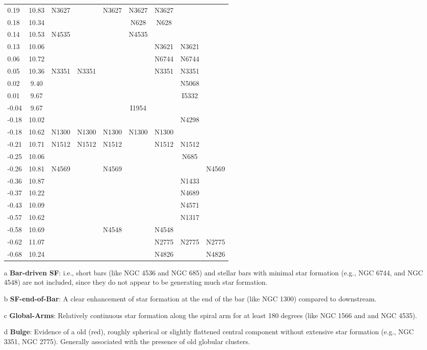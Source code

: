 \documentclass[linenumbers]{aastex63}
\begin{document}
\begin{table*}
\begin{center}
\begin{threeparttable}
\begin{tabular}{lcccccccc}
0.19 & 10.83 & N3627 &  & N3627 & N3627 & N3627 &  & \\
0.18 & 10.34 &  &  &  & N628 & N628 &  & \\
0.14 & 10.53 & N4535 &  &  & N4535 &  &  & \\
0.13 & 10.06 &  &  &  &  & N3621 & N3621 & \\
0.06 & 10.72 &  &  &  &  & N6744 & N6744 & \\
0.05 & 10.36 & N3351 & N3351 &  &  & N3351 & N3351 & \\
0.02 & 9.40 &  &  &  &  &  & N5068 & \\
0.01 & 9.67 &  &  &  &  &  & I5332 & \\
-0.04 & 9.67 &  &  &  & I1954 &  &  & \\
-0.18 & 10.02 &  &  &  &  &  & N4298 & \\
-0.18 & 10.62 & N1300 & N1300 & N1300 & N1300 & N1300 &  & \\
-0.21 & 10.71 & N1512 & N1512 & N1512 &  & N1512 & N1512 & \\
-0.25 & 10.06 &  &  &  &  &  & N685 & \\
-0.26 & 10.81 & N4569 &  & N4569 &  &  &  & N4569\\
-0.36 & 10.87 &  &  &  &  &  & N1433 & \\
-0.37 & 10.22 &  &  &  &  &  & N4689 & \\
-0.43 & 10.09 &  &  &  &  &  & N4571 & \\
-0.57 & 10.62 &  &  &  &  &  & N1317 & \\
-0.58 & 10.69 &  &  & N4548 &  & N4548 &  & \\
-0.62 & 11.07 &  &  &  &  & N2775 & N2775 & N2775\\
-0.68 & 10.24 &  &  &  &  & N4826 &  & N4826\\
\hline
\end{tabular} 
\begin{tablenotes}
\item[a] \textbf{Bar-driven SF}: i.e., short bars (like NGC 4536 and NGC 685) and stellar bars 
with minimal star formation
(e.g., NGC 6744, and NGC 4548) are not included, since they do not appear  to be generating much star formation. 
\item[b] \textbf{SF-end-of-Bar}: A clear enhancement of star formation at the end of the bar (like NGC 1300) compared to downstream.
\item[c] \textbf{Global-Arms}: Relatively continuous  star formation along the spiral arm for at least 180 degrees (like NGC 1566 and and NGC 4535).
\item[d] \textbf{Bulge}: Evidence of a old (red), roughly spherical or slightly flattened central component without extensive star formation (e.g., NGC 3351, NGC 2775). Generally associated with the presence of old globular clusters.  

\end{tablenotes}
\end{threeparttable}
\end{center}
\end{table*}
\end{document}
